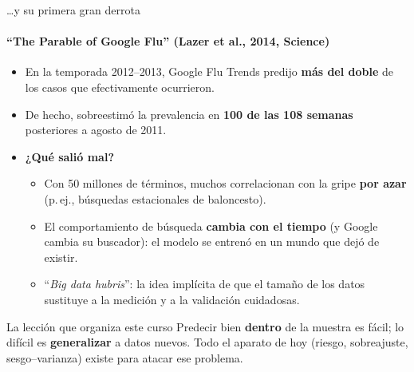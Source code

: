\documentclass{beamer}
\newcommand{\1}{\mathbb{I}}
\begin{document}
\begin{frame}{\ldots y su primera gran derrota}
\framesubtitle{``The Parable of Google Flu'' (Lazer et al., 2014, Science)}
\small
\begin{itemize}\itemsep5pt
  \item En la temporada 2012--2013, Google Flu Trends predijo \textbf{más del doble} de los casos que efectivamente ocurrieron. \pause
  \item De hecho, sobreestimó la prevalencia en \textbf{100 de las 108 semanas} posteriores a agosto de 2011. \pause
  \item \textbf{¿Qué salió mal?}
  \begin{itemize}\itemsep3pt
    \item Con 50 millones de términos, muchos correlacionan con la gripe \textbf{por azar} (p.\,ej., búsquedas estacionales de baloncesto).
    \item El comportamiento de búsqueda \textbf{cambia con el tiempo} (y Google cambia su buscador): el modelo se entrenó en un mundo que dejó de existir.
    \item ``\emph{Big data hubris}'': la idea implícita de que el tamaño de los datos sustituye a la medición y a la validación cuidadosas.
  \end{itemize} \pause
\end{itemize}

\begin{block}{La lección que organiza este curso}
Predecir bien \textbf{dentro} de la muestra es fácil; lo difícil es \textbf{generalizar} a datos nuevos. Todo el aparato de hoy (riesgo, sobreajuste, sesgo--varianza) existe para atacar ese problema.
\end{block}
\end{frame}
\end{document}
